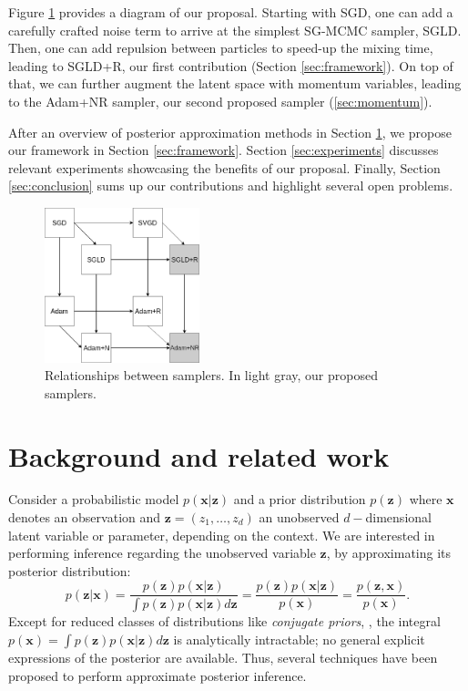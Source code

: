 Figure \ref{fig:diagram} provides a diagram of our proposal. Starting with SGD, one can add a carefully crafted noise term to arrive at the simplest SG-MCMC sampler, SGLD. Then, one can add repulsion between particles to speed-up the mixing time, leading to SGLD+R, our first contribution (Section \ref{sec:framework}). On top of that, we can further augment the latent space with momentum variables, leading to the Adam+NR sampler, our second proposed sampler (\ref{sec:momentum}).

After an overview of posterior approximation methods in Section \ref{sec:back}, we propose our framework in Section \ref{sec:framework}.
Section \ref{sec:experiments} discusses relevant experiments showcasing the benefits of our proposal. Finally, Section \ref{sec:conclusion} sums up our contributions and highlight several open problems.


\begin{figure}[!h]
    \centering
\includegraphics[width=0.4\textwidth]{img/sgmcmc}
    \caption{Relationships between samplers. In light gray, our proposed samplers.}\label{fig:diagram}
\end{figure}



\section{Background and related work}\label{sec:back}

Consider a probabilistic model $p(\bm{x}| \bm{z})$ and a prior distribution $p(\bm{z})$ where $\bm{x}$ denotes an observation and $\bm{z} = ( z_1, \ldots, z_d) $ an unobserved $d-$dimensional latent variable or parameter, depending on the context. We are interested in performing inference regarding the unobserved variable $\bm{z}$, by approximating its posterior distribution:
$$
p(\bm{z} | \bm{x}) = \frac{ p(\bm{z})p(\bm{x}| \bm{z}) }{ \int p(\bm{z})p(\bm{x}| \bm{z}) d\bm{z} } = \frac{ p(\bm{z})p(\bm{x}| \bm{z}) }{ p(\bm{x}) } = \frac{p(\bm{z},\bm{x})}{p(\bm{x})}.
$$
Except for reduced classes of distributions like \textit{conjugate priors}, \cite{raiffa1961applied}, the integral $p(\bm{x}) = \int p(\bm{z})p(\bm{x}| \bm{z}) d\bm{z}$ is analytically intractable; no general explicit expressions of the posterior are available. Thus, several techniques have been proposed to perform approximate posterior inference.



